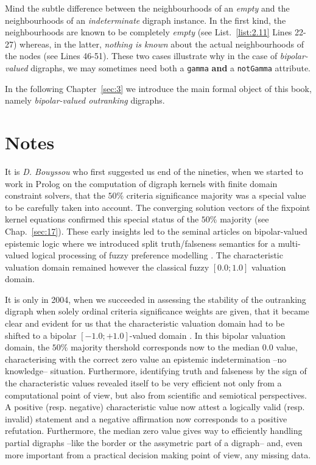 Mind the subtle difference between the neighbourhoods of an \emph{empty} and the neighbourhoods of an \emph{indeterminate} digraph instance. In the first kind, the neighbourhoods are known to be completely \emph{empty}  (see List.~\vref{list:2.11} Lines 22-27) whereas, in the latter, \emph{nothing is known} about the actual neighbourhoods of the nodes  (see Lines 46-51). These two cases illustrate why in the case of \emph{bipolar-valued} digraphs, we may sometimes need both a \texttt{gamma} \textbf{and} a \texttt{notGamma} attribute.

\vspace{1cm}
In the following Chapter~\ref{sec:3}  we introduce the main formal object of this book, namely \emph{bipolar-valued outranking} digraphs.

{}
\section*{Notes}

It is \emph{D. Bouyssou}  who first suggested us end of the nineties, when we started to work in Prolog on the computation of digraph kernels with finite domain constraint solvers, that the $50\%$ criteria significance majority was a special value to be carefully taken into account. The converging solution vectors of the fixpoint kernel equations confirmed this special status of the $50\%$ majority (see Chap.~\ref{sec:17}). These early insights led to the seminal articles on bipolar-valued epistemic logic where we introduced split truth/falseness semantics for a multi-valued logical processing of fuzzy preference modelling \citep{BIS-2000,BIS-2002}. The characteristic valuation domain remained however the classical fuzzy $[0.0;1.0]$ valuation domain.

It is only in 2004, when we succeeded in assessing the stability of the outranking digraph when solely ordinal criteria significance weights are given, that it became clear and evident for us that the characteristic valuation domain had to be shifted to a bipolar $[-1.0;+1.0]$-valued domain \citep{BIS-2004a}. In this bipolar valuation domain, the $50\%$ majority thershold corresponds now to the median $0.0$ value, characterising with the correct zero value an epistemic indetermination --no knowledge-- situation. Furthermore, identifying truth and falseness by the sign of the characteristic values revealed itself to be very efficient not only from a computational point of view, but also from scientific and semiotical perspectives. A positive (resp. negative) characteristic value now attest a logically valid (resp. invalid) statement and a negative affirmation now corresponds to a positive refutation. Furthermore, the median zero value gives way to efficiently handling partial digraphs --like the border or the assymetric part of a digraph-- and, even more important from a practical decision making point of view, any missing data.

